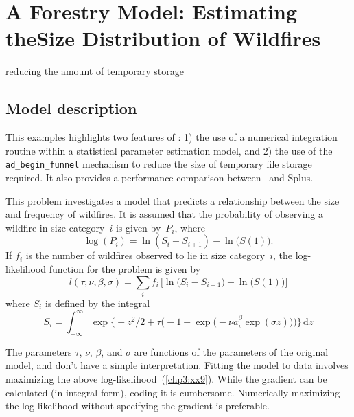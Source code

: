 \documentclass{admbmanual}
\begin{document}


\chapter{A Forestry Model: Estimating the\br Size Distribution of
 Wildfires}
%
{reducing the amount of temporary storage}

\section{Model description}

This examples highlights two features of \ADM: 1) the use of a numerical
integration routine within a statistical parameter estimation model, and 2) the
use of the \texttt{ad\_begin\_funnel} mechanism to reduce the size of temporary
file storage required. It also provides a performance comparison between \ADM\
and Splus.

This problem investigates a model that predicts a relationship between the size
and frequency of wildfires. It is assumed that the probability of observing a
wildfire in size category~$i$ is given by~$P_i$, where
\begin{equation*}
  \log(P_i)=\ln\left(S_i-S_{i+1}\right)-\ln\big(S(1)\big).
\end{equation*}
If $f_i$ is the number of wildfires observed to lie in size category~$i$, the
log-likelihood function for the problem is given by
\begin{equation}
  {
l(\tau,\nu,\beta,\sigma) =
   \sum_i f_i\,\Big[\ln\big(S_i-S_{i+1}\big)-\ln\big(S(1)\big)\Big]}
\label{chp3:xx9}
\end{equation}
where $S_i$ is defined by the integral
\begin{equation}
{
  S_i=\int_{-\infty}^\infty
  \exp\Big\{-z^2/2 +
  \tau\Big(-1+\exp\big(-\nu a_i^\beta\exp(\sigma z)\big)\Big) \Big\}
  \,\textrm{d}z}
\label{chp3:xx10}
\end{equation}

The parameters $\tau$, $\nu$, $\beta$, and $\sigma$ are functions of the
parameters of the original model, and don't have a simple interpretation.
Fitting the model to data involves maximizing the above
log-likelihood~(\ref{chp3:xx9}). %
While the gradient can be calculated (in integral form), coding it is
cumbersome. Numerically maximizing the log-likelihood without specifying the
gradient is preferable.
\end{document}
